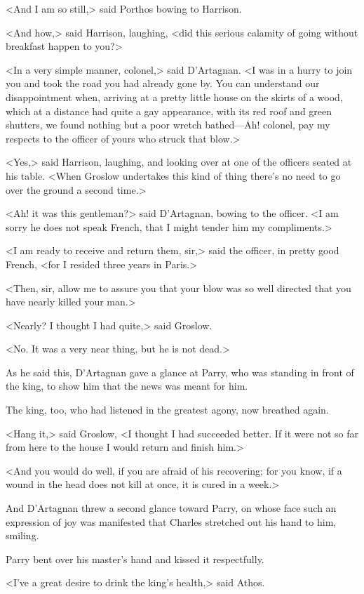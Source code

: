 <And I am so still,> said Porthos bowing to Harrison.

<And how,> said Harrison, laughing, <did this serious calamity of going without breakfast happen to you?>

<In a very simple manner, colonel,> said D'Artagnan. <I was in a hurry to join you and took the road you had already gone by. You can understand our disappointment when, arriving at a pretty little house on the skirts of a wood, which at a distance had quite a gay appearance, with its red roof and green shutters, we found nothing but a poor wretch bathed—Ah! colonel, pay my respects to the officer of yours who struck that blow.>

<Yes,> said Harrison, laughing, and looking over at one of the officers seated at his table. <When Groslow undertakes this kind of thing there's no need to go over the ground a second time.>

<Ah! it was this gentleman?> said D'Artagnan, bowing to the officer. <I am sorry he does not speak French, that I might tender him my compliments.>

<I am ready to receive and return them, sir,> said the officer, in pretty good French, <for I resided three years in Paris.>

<Then, sir, allow me to assure you that your blow was so well directed that you have nearly killed your man.>

<Nearly? I thought I had quite,> said Groslow.

<No. It was a very near thing, but he is not dead.>

As he said this, D'Artagnan gave a glance at Parry, who was standing in front of the king, to show him that the news was meant for him.

The king, too, who had listened in the greatest agony, now breathed again.

<Hang it,> said Groslow, <I thought I had succeeded better. If it were not so far from here to the house I would return and finish him.>

<And you would do well, if you are afraid of his recovering; for you know, if a wound in the head does not kill at once, it is cured in a week.>

And D'Artagnan threw a second glance toward Parry, on whose face such an expression of joy was manifested that Charles stretched out his hand to him, smiling.

Parry bent over his master's hand and kissed it respectfully.

<I've a great desire to drink the king's health,> said Athos.

